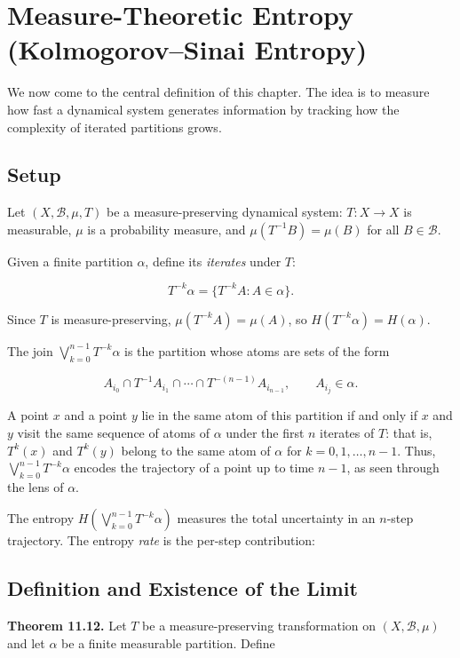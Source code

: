 \section{Measure-Theoretic Entropy (Kolmogorov–Sinai Entropy)}\label{sec:11.4}

We now come to the central definition of this chapter. The idea is to measure how fast a dynamical system generates information by tracking how the complexity of iterated partitions grows.

\subsection{Setup}\label{sec:11.4.1}

Let $(X, \mathcal{B}, \mu, T)$ be a measure-preserving dynamical system: $T \colon X \to X$ is measurable, $\mu$ is a probability measure, and $\mu(T^{-1}B) = \mu(B)$ for all $B \in \mathcal{B}$.

Given a finite partition $\alpha$, define its \textit{iterates} under $T$:

\[
T^{-k}\alpha = \{T^{-k}A : A \in \alpha\}.
\]

Since $T$ is measure-preserving, $\mu(T^{-k}A) = \mu(A)$, so $H(T^{-k}\alpha) = H(\alpha)$.

The join $\bigvee_{k=0}^{n-1} T^{-k}\alpha$ is the partition whose atoms are sets of the form

\[
A_{i_0} \cap T^{-1}A_{i_1} \cap \cdots \cap T^{-(n-1)}A_{i_{n-1}}, \qquad A_{i_j} \in \alpha.
\]

A point $x$ and a point $y$ lie in the same atom of this partition if and only if $x$ and $y$ visit the same sequence of atoms of $\alpha$ under the first $n$ iterates of $T$: that is, $T^k(x)$ and $T^k(y)$ belong to the same atom of $\alpha$ for $k = 0, 1, \ldots, n-1$. Thus, $\bigvee_{k=0}^{n-1} T^{-k}\alpha$ encodes the trajectory of a point up to time $n-1$, as seen through the lens of $\alpha$.

The entropy $H\!\left(\bigvee_{k=0}^{n-1} T^{-k}\alpha\right)$ measures the total uncertainty in an $n$-step trajectory. The entropy \textit{rate} is the per-step contribution:

\subsection{Definition and Existence of the Limit}\label{sec:11.4.2}

\textbf{Theorem 11.12.} Let $T$ be a measure-preserving transformation on $(X, \mathcal{B}, \mu)$ and let $\alpha$ be a finite measurable partition. Define

